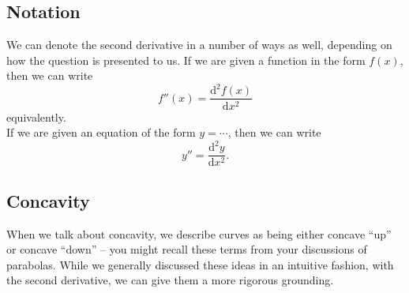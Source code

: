\documentclass[a4paper,11pt]{article}
\newcommand{\ndiff}[3]{\frac{\mathrm{d}^{#3}#1}{\mathrm{d}#2^{#3}}}
\begin{document}
\subsection*{Notation}
We can denote the second derivative in a number of ways as well, depending on how the question is presented to us. If we are given a function in the form $f(x)$, then we can write
$$
f''(x) = \ndiff{f(x)}{x}{2}
$$
equivalently.\\

\noindent If we are given an equation of the form $y=\cdots$, then we can write
$$
y'' = \ndiff{y}{x}{2}.
$$

\subsection*{Concavity}
When we talk about concavity, we describe curves as being either concave ``up'' or concave ``down'' -- you might recall these terms from your discussions of parabolas. While we generally discussed these ideas in an intuitive fashion, with the second derivative, we can give them a more rigorous grounding. 
\end{document}
